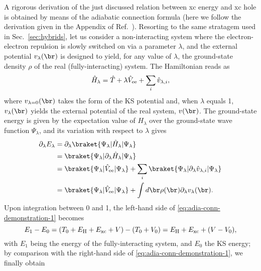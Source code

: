 A rigorous derivation of the just discussed relation between xc energy and xc hole is obtained by means of the adiabatic connection formula (here we follow the derivation given in the Appendix of Ref.~\cite{becke_correlation_1988}). Resorting to the same stratagem used in Sec.~\ref{sec:hybrids}, let us consider a non-interacting system where the electron-electron repulsion is slowly switched on via a parameter $\lambda$, and the external potential $v_{\lambda}(\br)$ is designed to yield, for any value of $\lambda$, the ground-state density $\rho$ of the real (fully-interacting) system. The Hamiltonian reads as
%
\begin{equation}
    \hat{H}_{\lambda} = \hat{T} + \lambda \hat{V}_{\rm ee} + \sum_i \hat{v}_{\lambda,i} ,
    \label{eq:adia-conn-hamiltonian}
\end{equation}
%
where $v_{\lambda=0}(\br)$ takes the form of the KS potential and, when $\lambda$ equals 1, $v_{\lambda}(\br)$ yields the external potential of the real system, $v(\br)$. The ground-state energy is given by the expectation value of $H_{\lambda}$ over the ground-state wave function $\Psi_{\lambda}$, and its variation with respect to $\lambda$ gives
%
\begin{equation}
    \begin{split}
    \partial_{\lambda} E_{\lambda} &= \partial_{\lambda} \braket{\Psi_{\lambda} | \hat{H}_{\lambda} | \Psi_{\lambda}} \\
    &= \braket{\Psi_{\lambda} | \partial_{\lambda} \hat{H}_{\lambda} | \Psi_{\lambda}} \\
    &= \braket{\Psi_{\lambda} | \hat{V}_{\rm ee} | \Psi_{\lambda}} + \sum_i \braket{\Psi_{\lambda} | \partial_{\lambda} \hat{v}_{\lambda,i} | \Psi_{\lambda}} \\
    &= \braket{\Psi_{\lambda} | \hat{V}_{\rm ee} | \Psi_{\lambda}} + \int d\br \rho(\br) \partial_{\lambda} v_{\lambda}(\br) .
    \end{split}
    \label{eq:adia-conn-demonstration-1}
\end{equation}
%
Upon integration between 0 and 1, the left-hand side of \cref{eq:adia-conn-demonstration-1} becomes
%
\begin{equation}
    E_1 - E_0 = (T_0 + E_{\rm H} + E_{\rm xc} + V) - (T_0 + V_0) = E_{\rm H} + E_{\rm xc} + (V - V_0) ,
    \label{eq:adia-conn-demonstration-2}
\end{equation}
%
with $E_1$ being the energy of the fully-interacting system, and $E_0$ the KS energy; by comparison with the right-hand side of \cref{eq:adia-conn-demonstration-1}, we finally obtain
